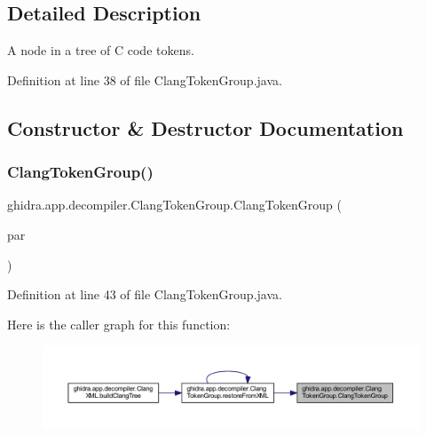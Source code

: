 \subsection{Detailed Description}
A node in a tree of C code tokens. 

Definition at line 38 of file Clang\+Token\+Group.\+java.



\subsection{Constructor \& Destructor Documentation}
\mbox{\label{classghidra_1_1app_1_1decompiler_1_1_clang_token_group_a65e4520e9729f191227a27f10bbc2720}} 
\subsubsection{\texorpdfstring{ClangTokenGroup()}{ClangTokenGroup()}}
{\footnotesize\ttfamily ghidra.\+app.\+decompiler.\+Clang\+Token\+Group.\+Clang\+Token\+Group (\begin{DoxyParamCaption}\item[{\mbox{\hyperlink{interfaceghidra_1_1app_1_1decompiler_1_1_clang_node}{Clang\+Node}}}]{par }\end{DoxyParamCaption})\hspace{0.3cm}{\ttfamily [inline]}}



Definition at line 43 of file Clang\+Token\+Group.\+java.

Here is the caller graph for this function\+:
\nopagebreak
\begin{figure}[H]
\begin{center}
\leavevmode
\includegraphics[width=350pt]{classghidra_1_1app_1_1decompiler_1_1_clang_token_group_a65e4520e9729f191227a27f10bbc2720_icgraph}
\end{center}
\end{figure}


